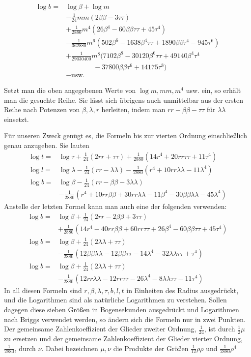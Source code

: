 \[
\begin{aligned}
\log b={}&\log\beta+\log m\\
&-\tfrac1{24}mm(2\beta\beta-3\tau\tau)\\
&+\tfrac1{2880}m^4(26\beta^4-60\beta\beta\tau\tau+45\tau^4)\\
&-\tfrac1{362880}m^6(502\beta^6-1638\beta^4\tau\tau+1890\beta\beta\tau^4-945\tau^6)\\
&+\tfrac1{29030400}m^8(7102\beta^8-30120\beta^6\tau\tau+49140\beta^4\tau^4\\
&\qquad\qquad-37800\beta\beta\tau^6+14175\tau^8)\\
&-\text{usw.}
\end{aligned}
\]

\indent Setzt man die oben angegebenen Werte von \(\log m,mm,m^4\) usw. ein, so erhält man die gesuchte Reihe. Sie lässt sich übrigens auch unmittelbar aus der ersten Reihe nach Potenzen von \(\beta,\lambda,r\) herleiten, indem man \(rr-\beta\beta-\tau\tau\) für \(\lambda\lambda\) einsetzt.

Für unseren Zweck genügt es, die Formeln bis zur vierten Ordnung einschließlich genau anzugeben. Sie lauten
\[
\begin{aligned}
\log t={}&\log\tau+\tfrac1{24}(2rr+\tau\tau)+\tfrac1{2880}(14r^4+20rr\tau\tau+11\tau^4)\\
\log l={}&\log\lambda-\tfrac1{24}(rr-\lambda\lambda)-\tfrac1{2880}(r^4+10rr\lambda\lambda-11\lambda^4)\\
\log b={}&\log\beta-\tfrac1{24}(rr-\beta\beta-3\lambda\lambda)\\
&-\tfrac1{2880}(r^4+10rr\beta\beta+30rr\lambda\lambda-11\beta^4-30\beta\beta\lambda\lambda-45\lambda^4)
\end{aligned}
\]
Anstelle der letzten Formel kann man auch eine der folgenden verwenden:
\[
\begin{aligned}
\log b={}&\log\beta+\tfrac1{24}(2rr-2\beta\beta+3\tau\tau)\\
&+\tfrac1{2880}(14r^4-40rr\beta\beta+60rr\tau\tau+26\beta^4-60\beta\beta\tau\tau+45\tau^4)\\
\log b={}&\log\beta+\tfrac1{24}(2\lambda\lambda+\tau\tau)\\
&-\tfrac1{2880}(12\beta\beta\lambda\lambda-12\beta\beta\tau\tau-14\lambda^4-32\lambda\lambda\tau\tau+\tau^4)\\
\log b={}&\log\beta+\tfrac1{24}(2\lambda\lambda+\tau\tau)\\
&-\tfrac1{2880}(12rr\lambda\lambda-12rr\tau\tau-26\lambda^4-8\lambda\lambda\tau\tau-11\tau^4)
\end{aligned}
\]
In all diesen Formeln sind \(r,\beta,\lambda,\tau,b,l,t\) in Einheiten des Radius ausgedrückt, und die Logarithmen sind als natürliche Logarithmen zu verstehen. Sollen dagegen diese sieben Größen in Bogensekunden ausgedrückt und Logarithmen nach Briggs verwendet werden, so ändern sich die Formeln nur in zwei Punkten. Der gemeinsame Zahlenkoeffizient der Glieder zweiter Ordnung, \(\frac1{24}\), ist durch \(\frac12\mu\) zu ersetzen und der gemeinsame Zahlenkoeffizient der Glieder vierter Ordnung, \(\frac1{2880}\), durch \(\nu\). Dabei bezeichnen \(\mu,\nu\) die Produkte der Größen \(\frac1{12}\rho\rho\) und \(\frac1{2880}\rho^4\)

